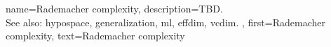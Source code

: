 {name={Rademacher complexity},
	description={TBD. 
		\\
		See also: \gls{hypospace}, \gls{generalization}, \gls{ml}, \gls{effdim}, \gls{vcdim}. },
	first={Rademacher complexity},
	text={Rademacher complexity}  
}

